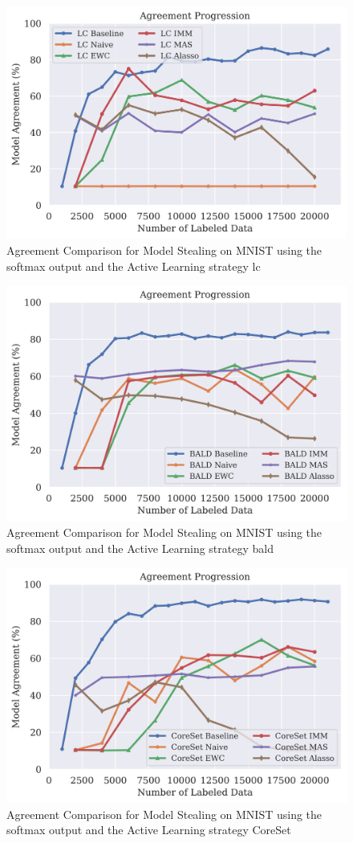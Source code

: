 \begin{figure}[!htb]
    \centering
    \includegraphics[width=0.5\linewidth]{images/results_CALMS/mnist_softmax_lc.png}
    \caption{Agreement Comparison for Model Stealing on MNIST using the softmax output and the Active Learning strategy \gls{lc}}
    \label{fig:CALMSMNISTSoftmaxLC}
\end{figure}

\begin{figure}[!htb]
    \centering
    \includegraphics[width=0.5\linewidth]{images/results_CALMS/mnist_softmax_bald.png}
    \caption{Agreement Comparison for Model Stealing on MNIST using the softmax output and the Active Learning strategy \gls{bald}}
    \label{fig:CALMSMNISTSoftmaxBALD}
\end{figure}

\begin{figure}[!htb]
    \centering
    \includegraphics[width=0.5\linewidth]{images/results_CALMS/mnist_softmax_coreset.png}
    \caption{Agreement Comparison for Model Stealing on MNIST using the softmax output and the Active Learning strategy CoreSet}
    \label{fig:CALMSMNISTSoftmaxCoreSet}
\end{figure}

